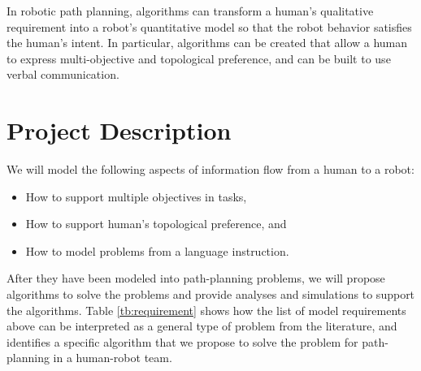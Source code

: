 \documentclass[phd]{byuprop}
\begin{document}
In robotic path planning, algorithms can transform a human's qualitative requirement into a robot's quantitative model so that the robot behavior satisfies the human's intent.
In particular, algorithms can be created that allow a human to express multi-objective and topological preference, and can be built to use verbal communication.

\section{Project Description}
\label{sec:project_description}

We will model the following aspects of information flow from a human to a robot: 
\begin{itemize}
	\item How to support multiple objectives in tasks,
	\item How to support human's topological preference, and
	\item How to model problems from a language instruction.
\end{itemize}
After they have been modeled into path-planning problems, we will propose algorithms to solve the problems and provide analyses and simulations to support the algorithms.
Table \ref{tb:requirement} shows how the list of model requirements above can be interpreted as a general type of problem from the literature, and identifies a specific algorithm that we propose to solve the problem for path-planning in a human-robot team.
\end{document}
